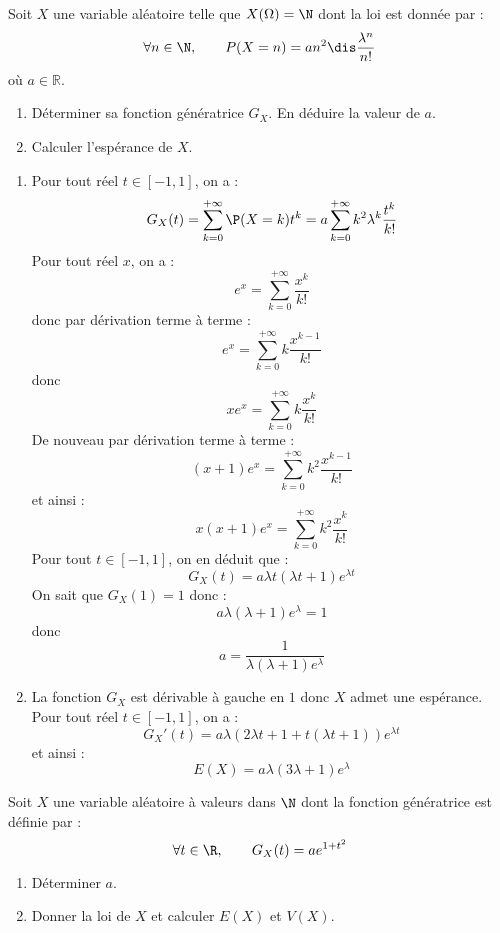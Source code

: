 \documentclass[a4paper,10pt]{report}
\begin{document}
\begin{Exa} Soit $X$ une variable al\'eatoire telle que $X(\Omega)=\N$ dont la loi est donnée par :
$$\forall n\in\N,\qquad P(X=n)=an^2\dis\frac{\lambda^n}{n!}$$
où $a \in \mathbb{R}$.
\begin{enumerate}
	\item D\'eterminer sa fonction g\'en\'eratrice $G_X.$ En d\'eduire la valeur de $a.$
	
	\item Calculer l'esp\'erance de $X.$
\end{enumerate}
\end{Exa}

\corr 

\begin{enumerate}
\item Pour tout réel $t \in [-1,1]$, on a :
$$ G_X(t) = \sum_{k=0}^{+ \infty} \P(X=k) t^k = a  \sum_{k=0}^{+ \infty} k^2 \lambda^k \dfrac{t^k}{k!} $$  
Pour tout réel $x$, on a :
$$ e^x = \sum_{k=0}^{+ \infty} \dfrac{x^k}{k!}$$
donc par dérivation terme à terme :
$$ e^x =  \sum_{k=0}^{+ \infty} k\dfrac{x^{k-1}}{k!}$$
donc
$$ x e^x =  \sum_{k=0}^{+ \infty} k\dfrac{x^{k}}{k!}$$
De nouveau par dérivation terme à terme :
$$ (x+1)e^x =  \sum_{k=0}^{+ \infty} k^2\dfrac{x^{k-1}}{k!}$$
et ainsi :
$$ x(x+1) e^x =  \sum_{k=0}^{+ \infty} k^2\dfrac{x^{k}}{k!}$$
Pour tout $t \in [-1,1]$, on en déduit que :
$$ G_X(t) = a \lambda t (\lambda t +1) e^{\lambda t}$$
On sait que $G_X(1)=1$ donc :
$$ a \lambda (\lambda + 1) e^{\lambda} = 1$$
donc
$$ a = \dfrac{1}{\lambda (\lambda+1) e^{\lambda}}$$
\item La fonction $G_X$ est dérivable à gauche en $1$ donc $X$ admet une espérance. Pour tout réel $t \in [-1,1]$, on a :
$$ G_X'(t) = a\lambda ( 2\lambda t+1 +  t (\lambda t + 1)) e^{\lambda t}$$
et ainsi :
$$ E(X) = a \lambda (3 \lambda +1 ) e^{\lambda}$$
\end{enumerate}


\begin{Exa} Soit $X$ une variable al\'eatoire \`a valeurs dans $\N$ dont la fonction g\'en\'eratrice est définie par :
$$\forall t\in\R,\qquad G_X(t)=ae^{1+t^2}$$

\begin{enumerate}
	\item D\'eterminer $a.$
	
	\item Donner la loi de $X$ et calculer $E(X)$ et $V(X).$
	
\end{enumerate}
\end{Exa}
\end{document}

